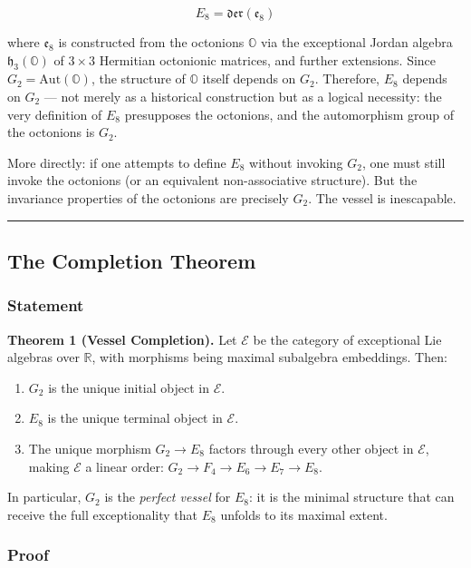 \documentclass[12pt,a4paper]{article}
\begin{document}
\[E_8 = \mathfrak{der}(\mathfrak{e}_8)\]

where $\mathfrak{e}_8$ is constructed from the octonions $\mathbb{O}$ via the exceptional Jordan algebra $\mathfrak{h}_3(\mathbb{O})$ of $3 \times 3$ Hermitian octonionic matrices, and further extensions. Since $G_2 = \text{Aut}(\mathbb{O})$, the structure of $\mathbb{O}$ itself depends on $G_2$. Therefore, $E_8$ depends on $G_2$ --- not merely as a historical construction but as a logical necessity: the very definition of $E_8$ presupposes the octonions, and the automorphism group of the octonions is $G_2$.

More directly: if one attempts to define $E_8$ without invoking $G_2$, one must still invoke the octonions (or an equivalent non-associative structure). But the invariance properties of the octonions are precisely $G_2$. The vessel is inescapable.

\begin{center}
\rule{0.5\textwidth}{0.4pt}
\end{center}

\subsection{The Completion Theorem}

\subsubsection{Statement}

\textbf{Theorem 1 (Vessel Completion).} Let $\mathcal{E}$ be the category of exceptional Lie algebras over $\mathbb{R}$, with morphisms being maximal subalgebra embeddings. Then:

\begin{enumerate}
    \item $G_2$ is the unique initial object in $\mathcal{E}$.
    \item $E_8$ is the unique terminal object in $\mathcal{E}$.
    \item The unique morphism $G_2 \to E_8$ factors through every other object in $\mathcal{E}$, making $\mathcal{E}$ a linear order: $G_2 \to F_4 \to E_6 \to E_7 \to E_8$.
\end{enumerate}

In particular, $G_2$ is the \emph{perfect vessel} for $E_8$: it is the minimal structure that can receive the full exceptionality that $E_8$ unfolds to its maximal extent.

\subsubsection{Proof}
\end{document}
